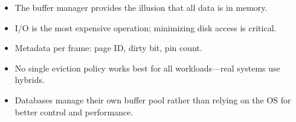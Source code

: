 \begin{itemize}
    \item The buffer manager provides the illusion that all data is in memory.
    \item I/O is the most expensive operation; minimizing disk access is critical.
    \item Metadata per frame: page ID, dirty bit, pin count.
    \item No single eviction policy works best for all workloads---real systems use hybrids.
    \item Databases manage their own buffer pool rather than relying on the OS for better control and performance.
\end{itemize}